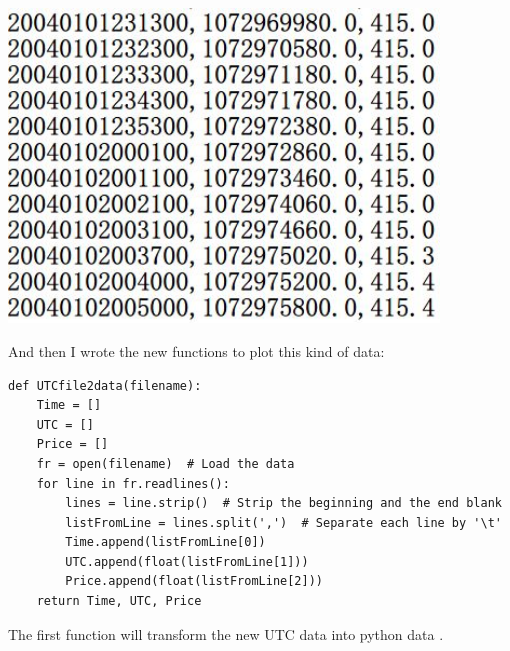 \documentclass[12pt]{article}
\begin{document}
\includegraphics[width = 4.5in]{3.jpg}

And then I wrote the new functions to plot this kind of data:

\begin{lstlisting}
def UTCfile2data(filename):
    Time = []
    UTC = []
    Price = []
    fr = open(filename)  # Load the data
    for line in fr.readlines():
        lines = line.strip()  # Strip the beginning and the end blank
        listFromLine = lines.split(',')  # Separate each line by '\t'
        Time.append(listFromLine[0])
        UTC.append(float(listFromLine[1]))
        Price.append(float(listFromLine[2]))
    return Time, UTC, Price
\end{lstlisting}

The first function will transform the new UTC data into python data .
\end{document}
